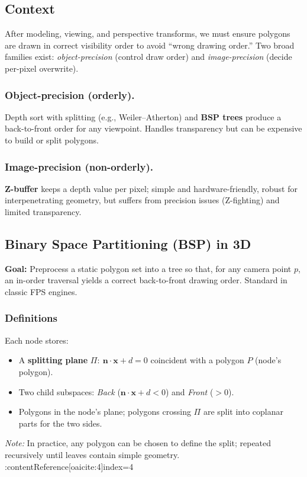 \documentclass[8pt,twocolumn]{extarticle}
\begin{document}
\subsection*{Context}
After modeling, viewing, and perspective transforms, we must ensure polygons are drawn in correct visibility order to avoid “wrong drawing order.” Two broad families exist: \emph{object-precision} (control draw order) and \emph{image-precision} (decide per-pixel overwrite).
\subsubsection*{Object-precision (orderly).}
Depth sort with splitting (e.g., Weiler–Atherton) and \textbf{BSP trees} produce a back-to-front order for any viewpoint. Handles transparency but can be expensive to build or split polygons. 
\subsubsection*{Image-precision (non-orderly).}
\textbf{Z-buffer} keeps a depth value per pixel; simple and hardware-friendly, robust for interpenetrating geometry, but suffers from precision issues (Z-fighting) and limited transparency. 
\subsection*{Binary Space Partitioning (BSP) in 3D}
\textbf{Goal:} Preprocess a static polygon set into a tree so that, for any camera point $p$, an in-order traversal yields a correct back-to-front drawing order. Standard in classic FPS engines.
\subsubsection*{Definitions}
Each node stores:
\begin{itemize}
  \item A \textbf{splitting plane} $\Pi:\ \mathbf{n}\cdot\mathbf{x}+d=0$ coincident with a polygon $P$ (node’s polygon).
  \item Two child subspaces: \emph{Back} ($\mathbf{n}\cdot\mathbf{x}+d<0$) and \emph{Front} ($>0$).
  \item Polygons in the node’s plane; polygons crossing $\Pi$ are split into coplanar parts for the two sides.
\end{itemize}
\emph{Note:} In practice, any polygon can be chosen to define the split; repeated recursively until leaves contain simple geometry. :contentReference[oaicite:4]{index=4}
\end{document}
